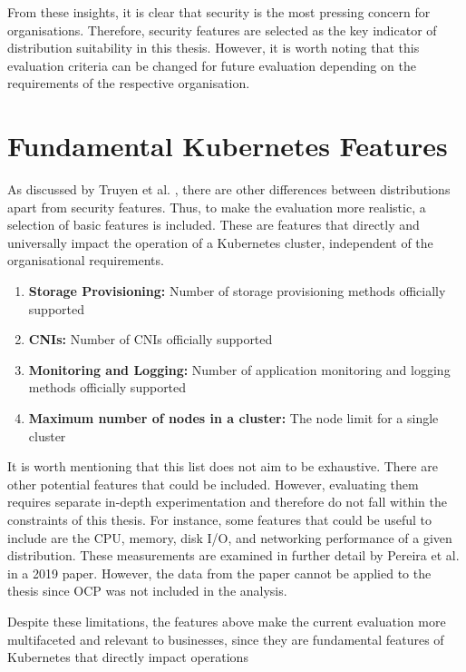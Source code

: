 From these insights, it is clear that security is the most pressing concern for organisations. Therefore, security features are selected as the key indicator of distribution suitability in this thesis. However, it is worth noting that this evaluation criteria can be changed for future evaluation depending on the requirements of the respective organisation.

\section{Fundamental Kubernetes Features}

As discussed by Truyen et al. \cite[202]{truyenManagingFeatureCompatibility2020}, there are other differences between distributions apart from security features. Thus, to make the evaluation more realistic, a selection of basic features is included. These are features that directly and universally impact the operation of a Kubernetes cluster, independent of the organisational requirements.

\begin{enumerate}
  \item \textbf{Storage Provisioning:} Number of storage provisioning methods officially supported
  \item \textbf{CNIs:} Number of CNIs officially supported
  \item \textbf{Monitoring and Logging:} Number of application monitoring and logging methods officially supported
  \item \textbf{Maximum number of nodes in a cluster:} The node limit for a single cluster
\end{enumerate}

It is worth mentioning that this list does not aim to be exhaustive. There are other potential features that could be included. However, evaluating them requires separate in-depth experimentation and therefore do not fall within the constraints of this thesis. For instance, some features that could be useful to include are the CPU, memory, disk I/O, and networking performance of a given distribution. These measurements are examined in further detail by Pereira et al. \cite{pereiraferreiraPerformanceEvaluationContainers2019} in a 2019 paper. However, the data from the paper cannot be applied to the thesis since OCP was not included in the analysis.

Despite these limitations, the features above make the current evaluation more multifaceted and relevant to businesses, since they are fundamental features of Kubernetes that directly impact operations

